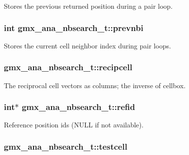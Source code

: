 \-Stores the previous returned position during a pair loop. \hypertarget{structgmx__ana__nbsearch__t_a65da5f2fc42c12519c40882033797606}{
\subsubsection[{prevnbi}]{\setlength{\rightskip}{0pt plus 5cm}int {\bf gmx\-\_\-ana\-\_\-nbsearch\-\_\-t\-::prevnbi}}}\label{structgmx__ana__nbsearch__t_a65da5f2fc42c12519c40882033797606}
\-Stores the current cell neighbor index during pair loops. \hypertarget{structgmx__ana__nbsearch__t_a56a6492d29f1009f39c9b8b58566fba6}{
\subsubsection[{recipcell}]{ {\bf gmx\-\_\-ana\-\_\-nbsearch\-\_\-t\-::recipcell}}}\label{structgmx__ana__nbsearch__t_a56a6492d29f1009f39c9b8b58566fba6}
\-The reciprocal cell vectors as columns; the inverse of {\ttfamily cellbox}. \hypertarget{structgmx__ana__nbsearch__t_a7a64da71bd5f939defd16814226914d7}{
\subsubsection[{refid}]{\setlength{\rightskip}{0pt plus 5cm}int$\ast$ {\bf gmx\-\_\-ana\-\_\-nbsearch\-\_\-t\-::refid}}}\label{structgmx__ana__nbsearch__t_a7a64da71bd5f939defd16814226914d7}
\-Reference position ids (\-N\-U\-L\-L if not available). \hypertarget{structgmx__ana__nbsearch__t_a1b5b5d0c03506d10f21d64168a9ff097}{
\subsubsection[{testcell}]{ {\bf gmx\-\_\-ana\-\_\-nbsearch\-\_\-t\-::testcell}}}\label{structgmx__ana__nbsearch__t_a1b5b5d0c03506d10f21d64168a9ff097}
